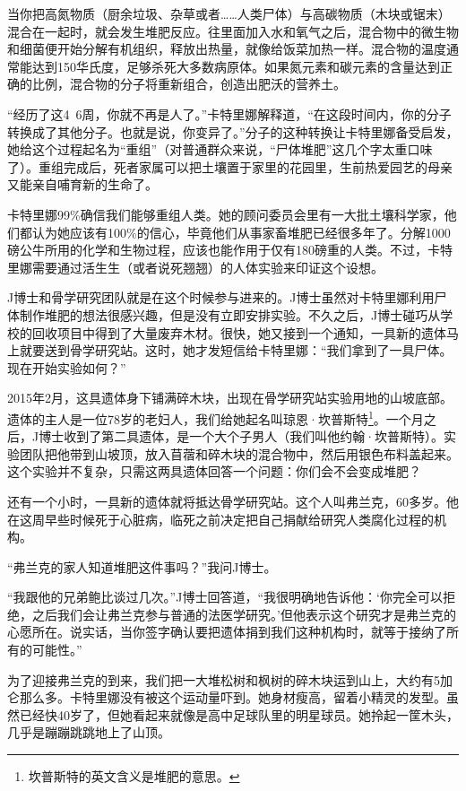 \documentclass[12pt,oneside]{book}
\begin{document}
\begin{bookref}[frametitle={\cite{好好告别：世界葬礼观察手记}}]
当你把高氮物质（厨余垃圾、杂草或者……人类尸体）与高碳物质（木块或锯末）混合在一起时，就会发生堆肥反应。往里面加入水和氧气之后，混合物中的微生物和细菌便开始分解有机组织，释放出热量，就像给饭菜加热一样。混合物的温度通常能达到150华氏度，足够杀死大多数病原体。如果氮元素和碳元素的含量达到正确的比例，混合物的分子将重新组合，创造出肥沃的营养土。

“经历了这4~6周，你就不再是人了。”卡特里娜解释道，“在这段时间内，你的分子转换成了其他分子。也就是说，你变异了。”分子的这种转换让卡特里娜备受启发，她给这个过程起名为“重组”（对普通群众来说，“尸体堆肥”这几个字太重口味了）。重组完成后，死者家属可以把土壤置于家里的花园里，生前热爱园艺的母亲又能亲自哺育新的生命了。

卡特里娜99\%确信我们能够重组人类。她的顾问委员会里有一大批土壤科学家，他们都认为她应该有100\%的信心，毕竟他们从事家畜堆肥已经很多年了。分解1000磅公牛所用的化学和生物过程，应该也能作用于仅有180磅重的人类。不过，卡特里娜需要通过活生生（或者说死翘翘）的人体实验来印证这个设想。

J博士和骨学研究团队就是在这个时候参与进来的。J博士虽然对卡特里娜利用尸体制作堆肥的想法很感兴趣，但是没有立即安排实验。不久之后，J博士碰巧从学校的回收项目中得到了大量废弃木材。很快，她又接到一个通知，一具新的遗体马上就要送到骨学研究站。这时，她才发短信给卡特里娜：“我们拿到了一具尸体。现在开始实验如何？”

2015年2月，这具遗体身下铺满碎木块，出现在骨学研究站实验用地的山坡底部。遗体的主人是一位78岁的老妇人，我们给她起名叫琼恩·坎普斯特\footnote{坎普斯特的英文含义是堆肥的意思。}。一个月之后，J博士收到了第二具遗体，是一个大个子男人（我们叫他约翰·坎普斯特）。实验团队把他带到山坡顶，放入苜蓿和碎木块的混合物中，然后用银色布料盖起来。这个实验并不复杂，只需这两具遗体回答一个问题：你们会不会变成堆肥？

还有一个小时，一具新的遗体就将抵达骨学研究站。这个人叫弗兰克，60多岁。他在这周早些时候死于心脏病，临死之前决定把自己捐献给研究人类腐化过程的机构。

“弗兰克的家人知道堆肥这件事吗？”我问J博士。

“我跟他的兄弟鲍比谈过几次。”J博士回答道，“我很明确地告诉他：‘你完全可以拒绝，之后我们会让弗兰克参与普通的法医学研究。’但他表示这个研究才是弗兰克的心愿所在。说实话，当你签字确认要把遗体捐到我们这种机构时，就等于接纳了所有的可能性。”

为了迎接弗兰克的到来，我们把一大堆松树和枫树的碎木块运到山上，大约有5加仑那么多。卡特里娜没有被这个运动量吓到。她身材瘦高，留着小精灵的发型。虽然已经快40岁了，但她看起来就像是高中足球队里的明星球员。她拎起一筐木头，几乎是蹦蹦跳跳地上了山顶。


\end{bookref}
\end{document}

